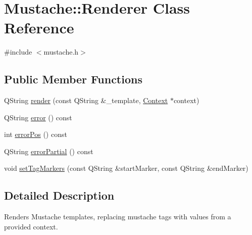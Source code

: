 \hypertarget{classMustache_1_1Renderer}{\section{Mustache\-:\-:Renderer Class Reference}
\label{classMustache_1_1Renderer}
}


{\ttfamily \#include $<$mustache.\-h$>$}

\subsection*{Public Member Functions}
\begin{DoxyCompactItemize}
\item 
Q\-String \hyperlink{classMustache_1_1Renderer_ab82d90fe802606145d1f7ed9f2a9cf81}{render} (const Q\-String \&\-\_\-template, \hyperlink{classMustache_1_1Context}{Context} $\ast$context)
\item 
Q\-String \hyperlink{classMustache_1_1Renderer_aaea1d06b2883b4f52a1117b7d5c5b75a}{error} () const 
\item 
int \hyperlink{classMustache_1_1Renderer_a35aea613ad6426661a715520fa617cb7}{error\-Pos} () const 
\item 
Q\-String \hyperlink{classMustache_1_1Renderer_aa26c1e3e2444cccd926e1d8a4a50fcef}{error\-Partial} () const 
\item 
void \hyperlink{classMustache_1_1Renderer_a4b61e7a727926ca21a812f6649488eb6}{set\-Tag\-Markers} (const Q\-String \&start\-Marker, const Q\-String \&end\-Marker)
\end{DoxyCompactItemize}


\subsection{Detailed Description}
Renders Mustache templates, replacing mustache tags with values from a provided context. 

